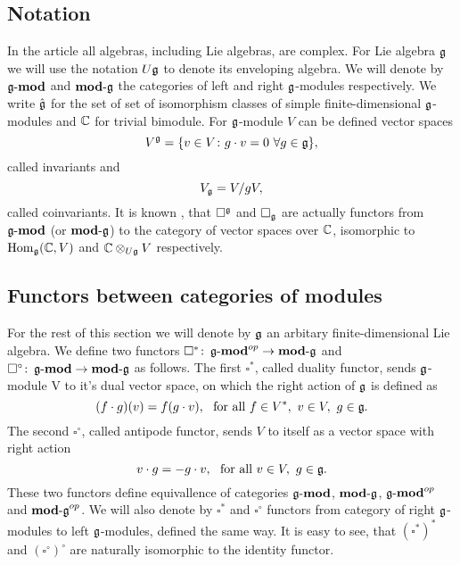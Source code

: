 % 

\subsection{Notation} 
In the article all algebras, including Lie algebras, are complex.  For Lie algebra $\mathfrak{g}$ we will
use the notation $U\mathfrak{g}$ to denote its enveloping algebra. We will denote by $\operatorname{\mathbf{\mathfrak{g}-mod}}$ and
$\operatorname{\mathbf{mod-\mathfrak{g}}}$ the categories of left and right $\mathfrak{g}$-modules respectively.  We write $\hat{\mathfrak{g}}$
for the set of set of isomorphism classes of simple finite-dimensional $\mathfrak{g}$-modules and $\mathbb{C}$
for trivial bimodule.  For $\mathfrak{g}$-module $V$ can be defined vector spaces 
\begin{equation}
    V^{\mathfrak{g}} = \{v\in V\colon g\cdot v = 0 ~ \forall g\in \mathfrak{g} \}, 
\end{equation}
called invariants and
\begin{equation}
    V_{\mathfrak{g}} = V/gV,
\end{equation}
called coinvariants. It is known , that $\square^{\mathfrak{g}}$ and $\square_{\mathfrak{g}}$ are actually
functors from $\operatorname{\mathbf{\mathfrak{g}-mod}}$ (or $\operatorname{\mathbf{mod-\mathfrak{g}}}$) to the category of vector spaces over $\mathbb{C}$,
isomorphic to $\operatorname{Hom}_{\mathfrak{g}}(\mathbb{C}, V)$ and $\mathbb{C} \otimes_{U\mathfrak{g}} V$ respectively. 

\subsection{Functors between categories of modules}
For the rest of this section we will denote by $\mathfrak{g}$ an arbitary finite-dimensional Lie algebra.
We define two functors $\square^*\colon \operatorname{\mathbf{\mathfrak{g}-mod}}^{op} \to \operatorname{\mathbf{mod-\mathfrak{g}}}$ and
$\square^\circ\colon \operatorname{\mathbf{\mathfrak{g}-mod}} \to \operatorname{\mathbf{mod-\mathfrak{g}}}$ as follows. The first $\square^*$, called
duality functor, sends $\mathfrak{g}$-module V to it's dual vector space, on which the right action of
$\mathfrak{g}$ is defined as 
\[
    (f\cdot g) (v) = f(g\cdot v),~\text{ for all } f\in V^*,~v \in V,~g\in\mathfrak{g}.
\]
The second $\square^\circ$, called antipode functor, sends $V$ to itself as a vector space with right
action
\[\label{test}
    v\cdot g = - g\cdot v,~\text{ for all } v \in V,~g\in\mathfrak{g}.
\]
These two functors define equivallence of categories $\operatorname{\mathbf{\mathfrak{g}-mod}}$, $\operatorname{\mathbf{mod-\mathfrak{g}}}$, $\operatorname{\mathbf{\mathfrak{g}-mod}}^{op}$
and $\operatorname{\mathbf{mod-\mathfrak{g}}}^{op}$. We will also denote by $\square^*$ and $\square^\circ$ functors from
category of right $\mathfrak{g}$-modules to left $\mathfrak{g}$-modules, defined the same way. It is easy to see,
that $(\square^*)^*$ and $(\square^\circ)^\circ$ are naturally isomorphic to the identity functor.

